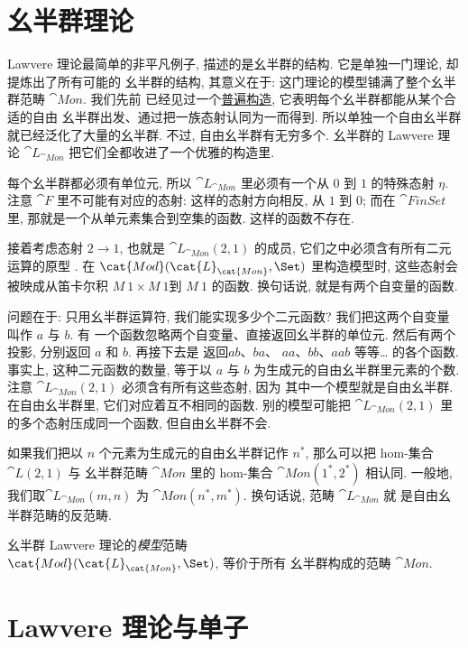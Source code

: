 \section{幺半群理论}

Lawvere 理论最简单的非平凡例子, 描述的是幺半群的结构. 它是单独一门理论, 却提炼出了所有可能的
幺半群的结构, 其意义在于: 这门理论的模型铺满了整个幺半群范畴 $\cat{Mon}$. 我们先前
已经见过一个\hyperref[free-monoids]{普遍构造}, 它表明每个幺半群都能从某个合适的自由
幺半群出发、通过把一族态射认同为一而得到. 所以单独一个自由幺半群就已经泛化了大量的幺半群. 不过,
自由幺半群有无穷多个. 幺半群的 Lawvere 理论 $\cat{L}_{\cat{Mon}}$ 把它们全都收进了一个优雅的构造里.

每个幺半群都必须有单位元, 所以 $\cat{L}_{\cat{Mon}}$ 里必须有一个从 $0$ 到 $1$ 的特殊态射 $\eta$.
注意 $\cat{F}$ 里不可能有对应的态射: 这样的态射方向相反, 从 $1$ 到 $0$; 而在 $\cat{FinSet}$ 里,
那就是一个从单元素集合到空集的函数. 这样的函数不存在.

接着考虑态射 $2 \to 1$, 也就是 $\cat{L}_{\cat{Mon}}(2, 1)$ 的成员, 它们之中必须含有所有二元运算的原型
.
在 $\cat{Mod}(\cat{L}_{\cat{Mon}}, \Set)$ 里构造模型时, 这些态射会被映成从笛卡尔积
$M\ 1 \times M\ 1$到 $M\ 1$ 的函数. 换句话说, 就是有两个自变量的函数.

问题在于: 只用幺半群运算符, 我们能实现多少个二元函数? 我们把这两个自变量叫作 $a$ 与 $b$. 有
一个函数忽略两个自变量、直接返回幺半群的单位元. 然后有两个投影, 分别返回 $a$ 和 $b$. 再接下去是
返回$ab$、$ba$、 $aa$、$bb$、$aab$ 等等\ldots{} 的各个函数. 事实上, 这种二元函数的数量, 等于以 $a$ 与
$b$ 为生成元的自由幺半群里元素的个数. 注意 $\cat{L}_{\cat{Mon}}(2, 1)$ 必须含有所有这些态射, 因为
其中一个模型就是自由幺半群. 在自由幺半群里, 它们对应着互不相同的函数. 别的模型可能把
$\cat{L}_{\cat{Mon}}(2, 1)$ 里的多个态射压成同一个函数, 但自由幺半群不会.

如果我们把以 $n$ 个元素为生成元的自由幺半群记作 $n^*$, 那么可以把 hom-集合 $\cat{L}(2, 1)$ 与
幺半群范畴 $\cat{Mon}$ 里的 hom-集合 $\cat{Mon}(1^*, 2^*)$ 相认同. 一般地,
我们取$\cat{L}_{\cat{Mon}}(m, n)$ 为 $\cat{Mon}(n^*, m^*)$. 换句话说, 范畴 $\cat{L}_{\cat{Mon}}$ 就
是自由幺半群范畴的反范畴.

幺半群 Lawvere 理论的\emph{模型}范畴\\ $\cat{Mod}(\cat{L}_{\cat{Mon}}, \Set)$, 等价于所有
幺半群构成的范畴 $\cat{Mon}$.

\section{Lawvere 理论与单子}

